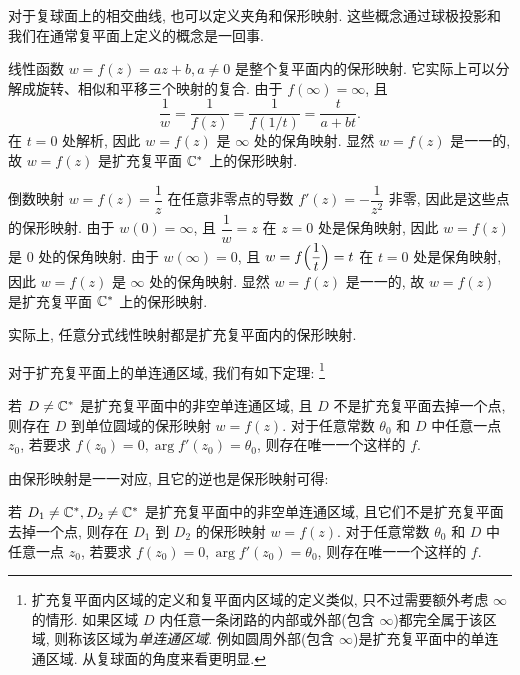 对于复球面上的相交曲线, 也可以定义夹角和保形映射.
这些概念通过球极投影和我们在通常复平面上定义的概念是一回事.

\begin{example}
  \label{exam:linear-transform}
  线性函数 $w=f(z)=az+b,a\neq 0$ 是整个复平面内的保形映射.
  它实际上可以分解成旋转、相似和平移三个映射的复合.
  由于 $f(\infty)=\infty$, 且
  \[
    \dfrac1w=\dfrac1{f(z)}=\dfrac1{f(1/t)}=\dfrac{t}{a+bt}.
  \]
  在 $t=0$ 处解析, 因此 $w=f(z)$ 是 $\infty$ 处的保角映射.
  显然 $w=f(z)$ 是一一的, 故 $w=f(z)$ 是扩充复平面 ${\mathbb{C}}^*$ 上的保形映射.
\end{example}

\begin{example}
  \label{exam:inverse-transform}
  倒数映射 $w=f(z)=\dfrac1z$ 在任意非零点的导数 $f'(z)=-\dfrac1{z^2}$ 非零, 因此是这些点的保形映射.
  由于 $w(0)=\infty$, 且 $\dfrac1w=z$ 在 $z=0$ 处是保角映射, 因此 $w=f(z)$ 是 $0$ 处的保角映射.
  由于 $w(\infty)=0$, 且 $w=f\Bigl(\dfrac1t\Bigr)=t$ 在 $t=0$ 处是保角映射, 因此 $w=f(z)$ 是 $\infty$ 处的保角映射.
  显然 $w=f(z)$ 是一一的, 故 $w=f(z)$ 是扩充复平面 ${\mathbb{C}}^*$ 上的保形映射.
\end{example}

实际上, 任意分式线性映射都是扩充复平面内的保形映射.

对于扩充复平面上的单连通区域, 我们有如下定理:
\footnote{
  扩充复平面内区域的定义和复平面内区域的定义类似, 只不过需要额外考虑 $\infty$ 的情形.
  如果区域 $D$ 内任意一条闭路的内部或外部(包含 $\infty$)都完全属于该区域, 则称该区域为\emph{单连通区域}.
  例如圆周外部(包含 $\infty$)是扩充复平面中的单连通区域.
  从复球面的角度来看更明显.
}

\begin{theorem}[黎曼映射定理]
  \label{thm:riemann-mapping}
  若 $D\neq{\mathbb{C}}^*$ 是扩充复平面中的非空单连通区域, 且 $D$ 不是扩充复平面去掉一个点, 则存在 $D$ 到单位圆域的保形映射 $w=f(z)$.
  对于任意常数 $\theta_0$ 和 $D$ 中任意一点 $z_0$, 若要求 $f(z_0)=0,\arg f'(z_0)=\theta_0$, 则存在唯一一个这样的 $f$.
\end{theorem}

由保形映射是一一对应, 且它的逆也是保形映射可得:
\begin{corollary}
  若 $D_1\neq{\mathbb{C}}^*,D_2\neq{\mathbb{C}}^*$ 是扩充复平面中的非空单连通区域, 且它们不是扩充复平面去掉一个点, 则存在 $D_1$ 到 $D_2$ 的保形映射 $w=f(z)$.
  对于任意常数 $\theta_0$ 和 $D$ 中任意一点 $z_0$, 若要求 $f(z_0)=0,\arg f'(z_0)=\theta_0$, 则存在唯一一个这样的 $f$.
\end{corollary}

